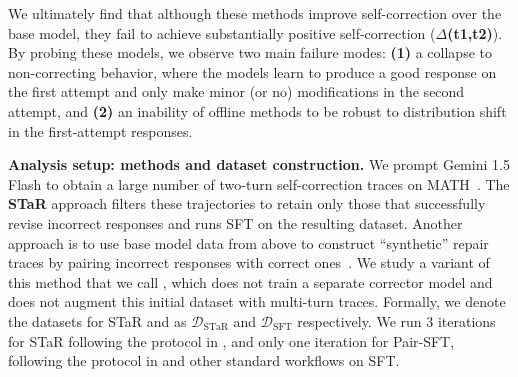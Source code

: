 We ultimately find that although these methods improve self-correction over the base model, they fail to achieve substantially positive self-correction ($\Delta$\textbf{(t1,t2)}). By probing these models, we observe two main failure modes: \textbf{(1)} a collapse to non-correcting behavior, where the models learn to produce a good response on the first attempt and only make minor (or no) modifications in the second attempt, and \textbf{(2)} an inability of offline methods to be robust to distribution shift in the first-attempt responses. 




\textbf{Analysis setup: methods and dataset construction.} We prompt Gemini 1.5 Flash to obtain a large number of two-turn self-correction traces on MATH~\citep{hendrycksmath2021}. The \textbf{STaR} approach filters these trajectories to retain only those that successfully revise incorrect responses and runs SFT on the resulting dataset. Another approach is to use base model data from above to construct ``synthetic'' repair traces by pairing incorrect responses with correct ones~\citep{welleck2023generating}. We study a variant of this method that we call \textbf{\pairsft{}}, which does not train a separate corrector model and does not augment this initial dataset with multi-turn traces. Formally, we denote the datasets for STaR and \pairsft{} as $\mathcal{D}_{\mathrm{STaR}}$ and $\mathcal{D}_{\mathrm{SFT}}$ respectively. We run 3 iterations for STaR following the protocol in \citet{singh2024human}, and only one iteration for Pair-SFT, following the protocol in \citet{welleck2023generating} and other standard workflows on SFT.



